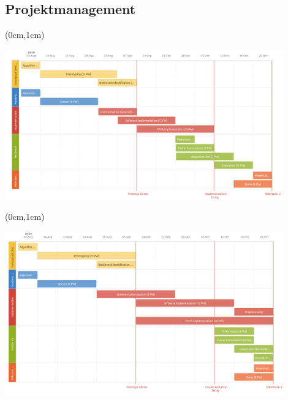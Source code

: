 \documentclass{beamer}
\begin{document}
\subsection{Projektmanagement}
\begin{frame}{\subsecname}
\begin{textblock*}{12.7cm}(0cm,1cm)
\begin{center}
\includegraphics[width=12cm]{images/roadmap.png}
\end{center}
\end{textblock*}
\end{frame}

\begin{frame}{\subsecname}
\begin{textblock*}{12.7cm}(0cm,1cm)
\begin{center}
\includegraphics[width=12cm]{images/roadmap_new.png}
\end{center}
\end{textblock*}
\end{frame}
\end{document}
